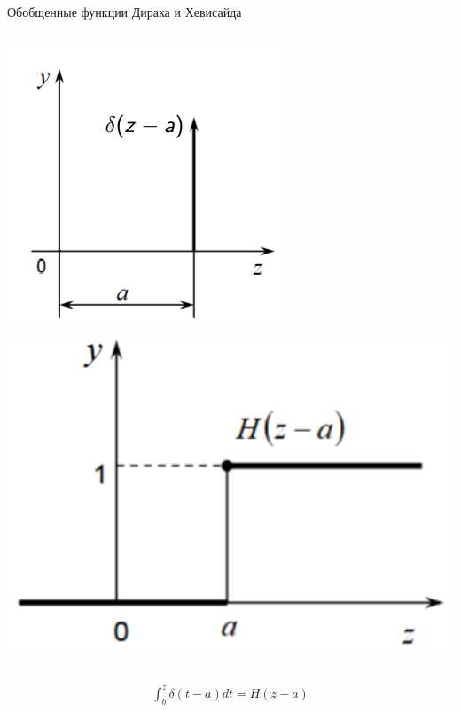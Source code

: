 \documentclass[ignoreonframetext,unicode]{beamer}
\begin{document}
\begin{frame}{Обобщенные функции Дирака и Хевисайда}
		\begin{columns}
			\includegraphics[width=\textwidth]{dirac}
			\includegraphics[width=1\textwidth]{heavi}
		\end{columns}
				
		\begin{gather*}
			\int_{b}^z \delta(t - a) d t = H(z - a)
		\end{gather*}
	
	\end{frame}
\end{document}
